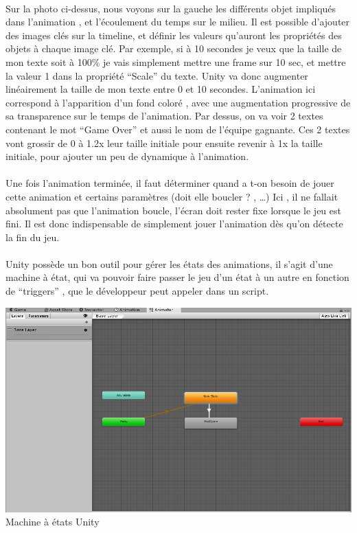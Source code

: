 \documentclass{report}
\begin{document}
\paragraph{}


Sur la photo ci-dessus, nous voyons sur la gauche les différents objet impliqués dans l’animation , et l’écoulement du temps sur le milieu. 
Il est possible d’ajouter des images clés sur la timeline, et définir les valeurs qu’auront les  propriétés des objets à chaque image clé. Par exemple, si à 10 secondes je veux que la taille de mon texte soit à 100\% je vais simplement mettre une frame sur 10 sec, et mettre la valeur 1 dans la propriété “Scale” du texte. Unity va donc augmenter linéairement la taille de mon texte entre 0 et 10 secondes.\newline
L’animation ici correspond à l’apparition d’un fond coloré , avec une augmentation progressive de sa transparence sur le temps de l’animation. Par dessus, on va voir 2 textes contenant le mot “Game Over” et aussi le nom de l’équipe gagnante. Ces 2 textes vont grossir de 0 à 1.2x leur taille initiale pour ensuite revenir à 1x la taille initiale, pour ajouter un peu de dynamique à l’animation.
\paragraph{}
Une fois l’animation terminée, il faut déterminer quand a t-on besoin de jouer cette animation et certains paramètres (doit elle boucler ? , …)
Ici , il ne fallait absolument pas que l’animation boucle, l’écran doit rester fixe lorsque le jeu est fini. Il est donc indispensable de simplement jouer l’animation dès qu’on détecte la fin du jeu. 
\paragraph{}
Unity possède un bon outil pour gérer les états des animations, il s’agit d’une machine à état, qui va pouvoir faire passer le jeu d’un état à un autre en fonction de “triggers” , que le développeur peut appeler dans un script. 

\begin{center}
\includegraphics[scale=0.5]{DATA/machineetat.png}
 {Machine à états Unity}
\end{center}
\end{document}
